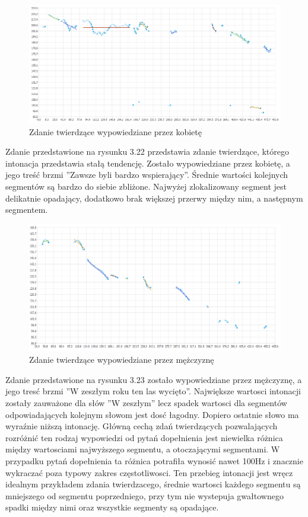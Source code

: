 \documentclass[a4paper,12 pt]{report}
\begin{document}
 \FloatBarrier
\begin{figure}[h]
\centering
\includegraphics[scale=0.9]{twierdzenie_1_kobieta.pdf}
\caption{Zdanie twierdzące wypowiedziane przez kobietę}
\end{figure}
\FloatBarrier
Zdanie przedstawione na rysunku 3.22 przedstawia zdanie twierdzące, którego intonacja przedstawia stałą tendencję. Zostało wypowiedziane przez kobietę, a jego treść brzmi ''Zawsze byli bardzo wspierający''. Średnie wartości kolejnych segmentów są bardzo do siebie zbliżone. Najwyżej zlokalizowany segment jest delikatnie opadający, dodatkowo brak większej przerwy między nim, a następnym segmentem.
 \FloatBarrier
\begin{figure}[h]
\centering
\includegraphics[scale=0.85]{twierdzenie_2_mezczyzna.pdf}
\caption{Zdanie twierdzące wypowiedziane przez mężczyznę}
\end{figure}
\FloatBarrier

Zdanie przedstawione na rysunku 3.23 zostało wypowiedziane przez mężczyznę, a jego tresć brzmi ''W zeszłym roku ten las wycięto''. Największe wartosci intonacji zostały zauważone dla słów ''W zeszłym'' lecz spadek wartosci dla segmentów odpowiadających kolejnym słowom jest dosć łagodny. Dopiero ostatnie słowo ma wyraźnie niższą intonację. Główną cechą zdań twierdzących pozwalających rozróżnić ten rodzaj wypowiedzi od pytań dopełnienia jest niewielka różnica między wartosciami najwyższego segmentu, a otoczającymi segmentami. W przypadku pytań dopełnienia ta różnica potrafiła wynosić nawet 100Hz i znacznie wykraczać poza typowy zakres częstotliwosci. Ten przebieg intonacji jest wręcz idealnym przykładem zdania twierdzacego, średnie wartosci każdego segmentu są mniejszego od segmentu poprzedniego, przy tym nie wystepuja gwałtownego spadki między nimi oraz wszystkie segmenty są opadające.
\end{document}
